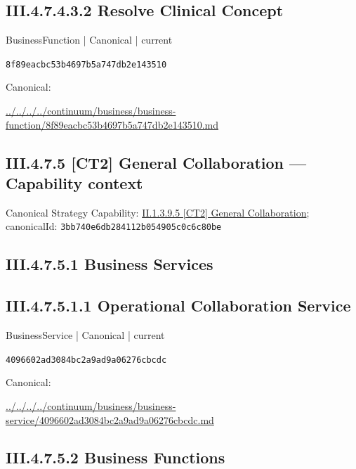 \documentclass[10pt,a4paper]{article}
\begin{document}
\subsection*{III.4.7.4.3.2 Resolve Clinical Concept}
\label{element-8f89eacbc53b4697b5a747db2e143510}
{\small BusinessFunction | Canonical | current}\par
\texttt{8f89eacbc53b4697b5a747db2e143510}\par
Canonical: \par
{\footnotesize\url{../../../../continuum/business/business-function/8f89eacbc53b4697b5a747db2e143510.md}}\par
\subsection*{III.4.7.5 [CT2] General Collaboration — Capability context}
Canonical Strategy Capability: \hyperref[element-3bb740e6db284112b054905c0c6c80be]{II.1.3.9.5 [CT2] General Collaboration}; canonicalId: \texttt{3bb740e6db284112b054905c0c6c80be}\par
\subsection*{III.4.7.5.1 Business Services}
\subsection*{III.4.7.5.1.1 Operational Collaboration Service}
\label{element-4096602ad3084bc2a9ad9a06276cbcdc}
{\small BusinessService | Canonical | current}\par
\texttt{4096602ad3084bc2a9ad9a06276cbcdc}\par
Canonical: \par
{\footnotesize\url{../../../../continuum/business/business-service/4096602ad3084bc2a9ad9a06276cbcdc.md}}\par
\subsection*{III.4.7.5.2 Business Functions}
\end{document}
